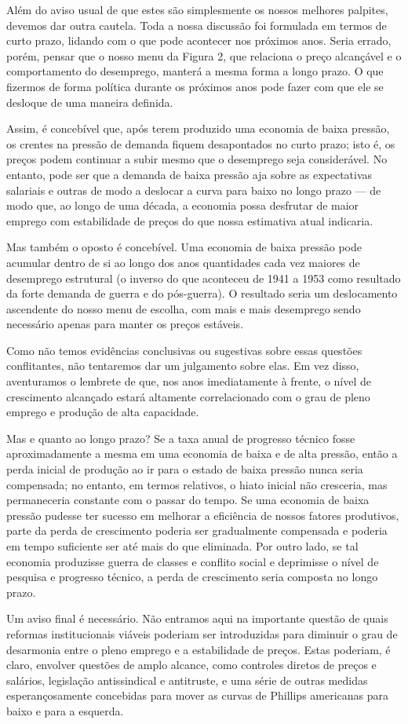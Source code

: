 \documentclass[12pt]{article}
\begin{document}
Além do aviso usual de que estes são simplesmente os nossos melhores palpites, devemos dar outra cautela. Toda a nossa discussão foi formulada em termos de curto prazo, lidando com o que pode acontecer nos próximos anos. Seria errado, porém, pensar que o nosso menu da Figura 2, que relaciona o preço alcançável e o comportamento do desemprego, manterá a mesma forma a longo prazo. O que fizermos de forma política durante os próximos anos pode fazer com que ele se desloque de uma maneira definida.

Assim, é concebível que, após terem produzido uma economia de baixa pressão, os crentes na pressão de demanda fiquem desapontados no curto prazo; isto é, os preços podem continuar a subir mesmo que o desemprego seja considerável. No entanto, pode ser que a demanda de baixa pressão aja sobre as expectativas salariais e outras de modo a deslocar a curva para baixo no longo prazo — de modo que, ao longo de uma década, a economia possa desfrutar de maior emprego com estabilidade de preços do que nossa estimativa atual indicaria.

Mas também o oposto é concebível. Uma economia de baixa pressão pode acumular dentro de si ao longo dos anos quantidades cada vez maiores de desemprego estrutural (o inverso do que aconteceu de 1941 a 1953 como resultado da forte demanda de guerra e do pós-guerra). O resultado seria um deslocamento ascendente do nosso menu de escolha, com mais e mais desemprego sendo necessário apenas para manter os preços estáveis.

Como não temos evidências conclusivas ou sugestivas sobre essas questões conflitantes, não tentaremos dar um julgamento sobre elas. Em vez disso, aventuramos o lembrete de que, nos anos imediatamente à frente, o nível de crescimento alcançado estará altamente correlacionado com o grau de pleno emprego e produção de alta capacidade.

Mas e quanto ao longo prazo? Se a taxa anual de progresso técnico fosse aproximadamente a mesma em uma economia de baixa e de alta pressão, então a perda inicial de produção ao ir para o estado de baixa pressão nunca seria compensada; no entanto, em termos relativos, o hiato inicial não cresceria, mas permaneceria constante com o passar do tempo. Se uma economia de baixa pressão pudesse ter sucesso em melhorar a eficiência de nossos fatores produtivos, parte da perda de crescimento poderia ser gradualmente compensada e poderia em tempo suficiente ser até mais do que eliminada. Por outro lado, se tal economia produzisse guerra de classes e conflito social e deprimisse o nível de pesquisa e progresso técnico, a perda de crescimento seria composta no longo prazo.

Um aviso final é necessário. Não entramos aqui na importante questão de quais reformas institucionais viáveis poderiam ser introduzidas para diminuir o grau de desarmonia entre o pleno emprego e a estabilidade de preços. Estas poderiam, é claro, envolver questões de amplo alcance, como controles diretos de preços e salários, legislação antissindical e antitruste, e uma série de outras medidas esperançosamente concebidas para mover as curvas de Phillips americanas para baixo e para a esquerda.
\end{document}
